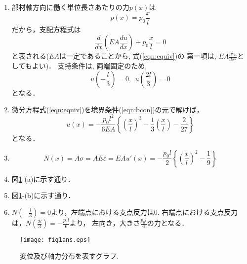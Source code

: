 \documentclass[10pt,a4j]{jarticle}
\begin{document}
\begin{enumerate}
\item
部材軸方向に働く単位長さあたりの力$p(x)$は
\begin{equation}
	p(x)= p_0\frac{x}{l}
	\label{eqn:body_force}
\end{equation}
だから，支配方程式は
\begin{equation}
	\frac{d}{dx  }\left( EA\frac{du}{dx}\right)
	+
	p_0\frac{x}{l}
	=0
	\label{eqn:equiv}
\end{equation}
と表される($EA$は一定であることから, 式(\ref{eqn:equiv})の
第一項は, $EA\frac{d^2u}{dx^2}$としてもよい)．
支持条件は, 両端固定のため,
\begin{equation}
	u\left(-\frac{l}{3}\right)=0, \ \ u\left(\frac{2l}{3}\right)=0
	\label{eqn:bcon}
\end{equation}
となる．
\item
微分方程式(\ref{eqn:equiv})を境界条件(\ref{eqn:bcon})の元で解けば，
\begin{equation}
	u(x)=
	-
	\frac{p_0l^2}{6EA}
	\left\{ 
		\left(\frac{x}{l}\right)^3
		-
		\frac{1}{3}
		\left(\frac{x}{l}\right)
		-\frac{2}{27}
	\right\}
	\label{eqn:disp}
\end{equation}
となる．
\item
\begin{equation}
	N(x)= A \sigma = AE\varepsilon=EA u'(x)
	=
	-\frac{p_0l}{2}
		\left\{
		\left( \frac{x}{l} \right)^2 
		-\frac{1}{9}
		\right\}
\end{equation}
\item
図\ref{fig:fig1}-(a)に示す通り．
\item
図\ref{fig:fig1}-(b)に示す通り．
\item
	$N\left(-\frac{l}{3}\right)=0$より，左端点における支点反力は0.
		右端点における支点反力は，$N\left(\frac{2l}{3}\right)=-\frac{p_0l}{6}$より，
		左向き，大きさ$\frac{p_0l}{6}$の力となる．
\end{enumerate}
\begin{figure}[h]
	\vspace{-3mm}
	\begin{center}
	\texttt{[image: fig1ans.eps]} 
	\end{center}
	\vspace{-5mm}
	\caption{変位及び軸力分布を表すグラフ.} 
	\label{fig:fig1}
\end{figure}
\end{document}
